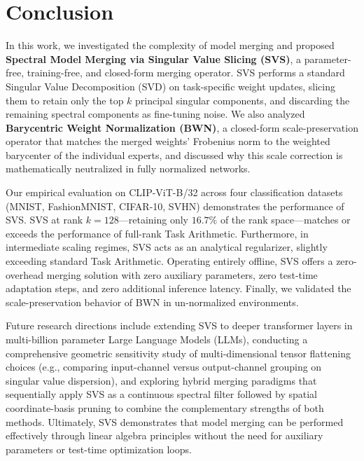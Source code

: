 \section{Conclusion}
\label{sec:conclusion}

In this work, we investigated the complexity of model merging and proposed \textbf{Spectral Model Merging via Singular Value Slicing (SVS)}, a parameter-free, training-free, and closed-form merging operator. SVS performs a standard Singular Value Decomposition (SVD) on task-specific weight updates, slicing them to retain only the top $k$ principal singular components, and discarding the remaining spectral components as fine-tuning noise. We also analyzed \textbf{Barycentric Weight Normalization (BWN)}, a closed-form scale-preservation operator that matches the merged weights' Frobenius norm to the weighted barycenter of the individual experts, and discussed why this scale correction is mathematically neutralized in fully normalized networks.

Our empirical evaluation on CLIP-ViT-B/32 across four classification datasets (MNIST, FashionMNIST, CIFAR-10, SVHN) demonstrates the performance of SVS. SVS at rank $k=128$—retaining only $16.7\%$ of the rank space—matches or exceeds the performance of full-rank Task Arithmetic. Furthermore, in intermediate scaling regimes, SVS acts as an analytical regularizer, slightly exceeding standard Task Arithmetic. Operating entirely offline, SVS offers a zero-overhead merging solution with zero auxiliary parameters, zero test-time adaptation steps, and zero additional inference latency. Finally, we validated the scale-preservation behavior of BWN in un-normalized environments.

Future research directions include extending SVS to deeper transformer layers in multi-billion parameter Large Language Models (LLMs), conducting a comprehensive geometric sensitivity study of multi-dimensional tensor flattening choices (e.g., comparing input-channel versus output-channel grouping on singular value dispersion), and exploring hybrid merging paradigms that sequentially apply SVS as a continuous spectral filter followed by spatial coordinate-basis pruning to combine the complementary strengths of both methods. Ultimately, SVS demonstrates that model merging can be performed effectively through linear algebra principles without the need for auxiliary parameters or test-time optimization loops.

